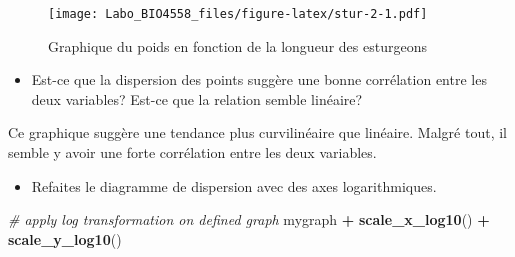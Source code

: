 \documentclass[
  12pt,
]{book}
\newenvironment{Shaded}{\begin{snugshade}}{\end{snugshade}}
\newcommand{\CommentTok}[1]{\textcolor[rgb]{0.56,0.35,0.01}{\textit{#1}}}
\newcommand{\DataTypeTok}[1]{\textcolor[rgb]{0.13,0.29,0.53}{#1}}
\newcommand{\KeywordTok}[1]{\textcolor[rgb]{0.13,0.29,0.53}{\textbf{#1}}}
\newcommand{\NormalTok}[1]{#1}
\newcommand{\OperatorTok}[1]{\textcolor[rgb]{0.81,0.36,0.00}{\textbf{#1}}}
\newcommand{\OtherTok}[1]{\textcolor[rgb]{0.56,0.35,0.01}{#1}}
\newcommand{\StringTok}[1]{\textcolor[rgb]{0.31,0.60,0.02}{#1}}
\providecommand{\tightlist}{%
  \setlength{\itemsep}{0pt}\setlength{\parskip}{0pt}}
\begin{document}
\begin{Shaded}
\end{Shaded}

\begin{figure}
\centering
\texttt{[image: Labo\_BIO4558\_files/figure-latex/stur-2-1.pdf]}
\caption{\label{fig:stur-2}Graphique du poids en fonction de la longueur des esturgeons}
\end{figure}

\begin{itemize}
\tightlist
\item
  Est-ce que la dispersion des points suggère une bonne corrélation entre les deux variables?
  Est-ce que la relation semble linéaire?
\end{itemize}

Ce graphique suggère une tendance plus curvilinéaire que linéaire.
Malgré tout, il semble y avoir une forte corrélation entre les deux variables.

\begin{itemize}
\tightlist
\item
  Refaites le diagramme de dispersion avec des axes logarithmiques.
\end{itemize}

\begin{Shaded}
\begin{Highlighting}[]
\CommentTok{\# apply log transformation on defined graph}
\NormalTok{mygraph }\OperatorTok{+}\StringTok{ }\KeywordTok{scale\_x\_log10}\NormalTok{() }\OperatorTok{+}\StringTok{ }\KeywordTok{scale\_y\_log10}\NormalTok{()}
\end{Highlighting}
\end{Shaded}
\end{document}
